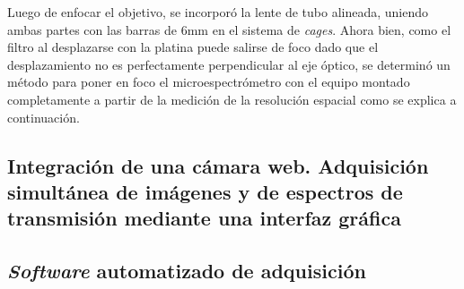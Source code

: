 \begin{figure}[H]
\begin{floatrow}
	\end{floatrow}
\end{figure}

Luego de enfocar el objetivo, se incorporó la lente de tubo alineada, uniendo ambas partes con las barras de 6mm en el sistema de \textit{cages}. Ahora bien, como el filtro al desplazarse con la platina puede salirse de foco dado que el desplazamiento no es perfectamente perpendicular al eje óptico, se determinó un método para poner en foco el microespectrómetro con el equipo montado completamente a partir de la medición de la resolución espacial como se explica a continuación.



\singlespacing
\subsection{Integración de una cámara web. Adquisición simultánea de imágenes y de espectros de transmisión mediante una interfaz gráfica \href{https://github.com/jrr1984/defectsGUI}{\faGithub}}
\label{sec:camwebgui}


\singlespacing
\subsection{\textit{Software} automatizado de adquisición}
\label{sec:softadq}

